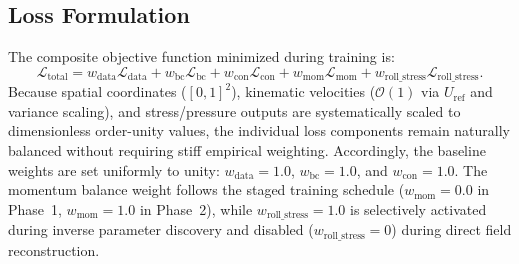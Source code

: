 \subsection{Loss Formulation}
\label{subsec:multiobjective_loss_formulation}

The composite objective function minimized during training is:
\begin{equation}
    \mathcal{L}_{\mathrm{total}} = w_{\mathrm{data}} \mathcal{L}_{\mathrm{data}} + w_{\mathrm{bc}} \mathcal{L}_{\mathrm{bc}} + w_{\mathrm{con}} \mathcal{L}_{\mathrm{con}} + w_{\mathrm{mom}} \mathcal{L}_{\mathrm{mom}} + w_{\mathrm{roll\_stress}} \mathcal{L}_{\mathrm{roll\_stress}} .
    \label{eq:composite_loss_detailed}
\end{equation}
Because spatial coordinates ($[0, 1]^2$), kinematic velocities ($\mathcal{O}(1)$ via
$U_{\mathrm{ref}}$ and variance scaling), and stress/pressure outputs are systematically
scaled to dimensionless order-unity values, the individual loss components remain
naturally balanced without requiring stiff empirical weighting.
Accordingly, the baseline weights are set uniformly to unity:
$w_{\mathrm{data}} = 1.0$, $w_{\mathrm{bc}} = 1.0$, and $w_{\mathrm{con}} = 1.0$.
The momentum balance weight follows the staged training schedule ($w_{\mathrm{mom}} = 0.0$
in Phase~1, $w_{\mathrm{mom}} = 1.0$ in Phase~2), while $w_{\mathrm{roll\_stress}} = 1.0$
is selectively activated during inverse parameter discovery and disabled
($w_{\mathrm{roll\_stress}} = 0$) during direct field reconstruction.

